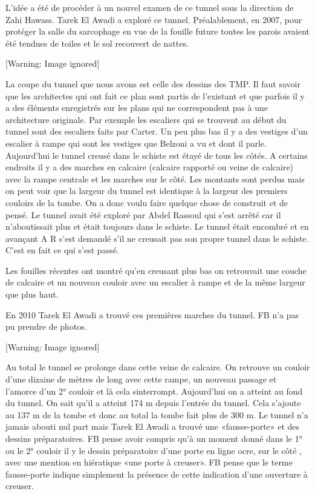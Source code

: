 \documentclass{article}
\begin{document}
L’idée a été de procéder à un nouvel examen de ce tunnel sous la
direction de Zahi Hawass. Tarek El Awadi  a exploré ce tunnel.
Préalablement, en 2007, pour protéger la salle du sarcophage en vue de
la fouille future toutes les parois avaient été tendues de toiles et le
sol recouvert de nattes. 

  [Warning: Image ignored] %
 

La coupe du tunnel que nous avons est celle des dessins des TMP. Il faut
savoir que les architectes qui ont fait ce plan sont partis de
l’existant et que parfois il y a des éléments enregistrés sur les plans
qui ne correspondent pas à une architecture originale. Par exemple les
escaliers qui se trouvent au début du tunnel sont des escaliers faits
par Carter. Un peu plus bas il y a des vestiges d’un escalier à rampe
qui sont les vestiges que Belzoni a vu et dont il parle. Aujourd’hui le
tunnel creusé dans le schiste est étayé de tous les côtés. A certains
endroits il y a des marches en calcaire (calcaire rapporté ou veine de
calcaire) avec la rampe centrale et les marches sur le côté. Les
montants sont perdus mais on peut voir que la largeur du tunnel est
identique à la largeur des premiers couloirs de la tombe. On a donc
voulu faire quelque chose de construit et de pensé. Le tunnel avait été
exploré par Abdel Rassoul qui s’est arrêté car il n’aboutissait plus et
était toujours dans le schiste. Le tunnel était encombré et en avançant
A R s’est demandé s’il ne creusait pas son propre tunnel dans le
schiste. C’est en fait ce qui s’est passé.

Les fouilles récentes ont montré qu’en creusant plus bas on retrouvait
une couche de calcaire et un nouveau couloir avec un escalier à rampe
et de la même largeur que plus haut. 

En 2010 Tarek El Awadi a trouvé ces premières marches du tunnel. FB n’a
pas pu prendre de photos.

  [Warning: Image ignored] %
 

Au total le tunnel se prolonge dans cette veine de calcaire. On retrouve
un couloir d’une dizaine de mètres de long avec cette rampe, un nouveau
passage et l’amorce d’un 2° couloir et là cela
s{\textquotesingle}interrompt. Aujourd’hui on a atteint au fond du
tunnel. On sait qu’il a atteint 174 m depuis l’entrée du tunnel. Cela
s’ajoute au 137 m de la tombe et donc au total la tombe fait plus de
300 m. Le tunnel n’a jamais abouti nul part mais Tarek El Awadi a
trouvé une «fausse-porte» et des dessins préparatoires. FB pense avoir
compris qu’à un moment donné dans le 1° ou le 2° couloir il y le dessin
préparatoire d’une porte en ligne ocre, sur le côté , avec une mention
en hiératique «une porte à creuser». FB pense que le terme fausse-porte
indique simplement la présence de cette indication d’une ouverture à
creuser.
\end{document}

